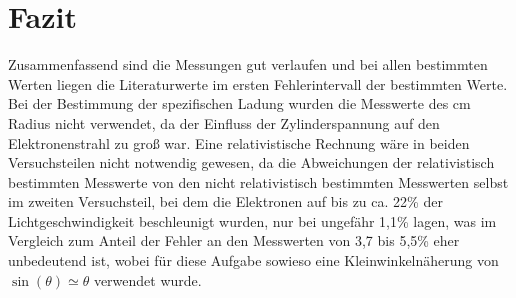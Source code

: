 \documentclass[12pt,a4paper]{article}
\begin{document}
\section{Fazit}
Zusammenfassend sind die Messungen gut verlaufen und bei allen bestimmten Werten liegen die Literaturwerte im ersten Fehlerintervall der bestimmten Werte. Bei der Bestimmung der spezifischen Ladung wurden die Messwerte des \unit[2]{cm} Radius nicht verwendet, da der Einfluss der Zylinderspannung auf den Elektronenstrahl zu groß war. Eine relativistische Rechnung wäre in beiden Versuchsteilen nicht notwendig gewesen, da die Abweichungen der relativistisch bestimmten Messwerte von den nicht relativistisch bestimmten Messwerten selbst im zweiten Versuchsteil, bei dem die Elektronen auf bis zu ca. 22\% der Lichtgeschwindigkeit beschleunigt wurden, nur bei ungefähr 1,1\% lagen, was im Vergleich zum Anteil der Fehler an den Messwerten von 3,7 bis 5,5\% eher unbedeutend ist, wobei für diese Aufgabe sowieso eine Kleinwinkelnäherung von $\sin(\theta) \simeq \theta$ verwendet wurde.
\end{document}
